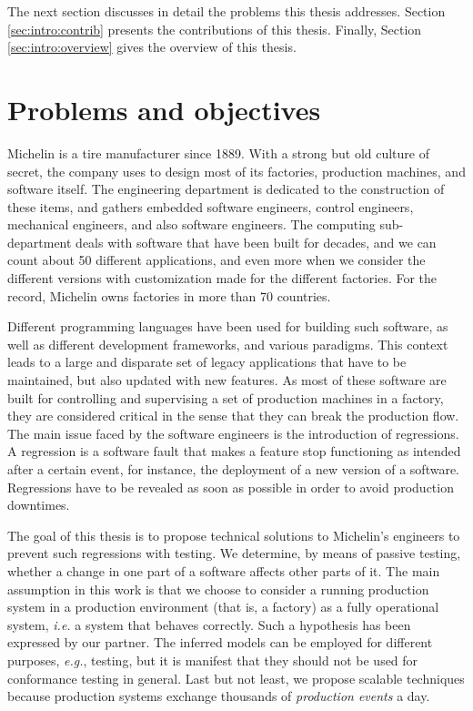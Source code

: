 The next section discusses in detail the problems this thesis
addresses. Section \ref{sec:intro:contrib} presents the
contributions of this thesis. Finally, Section
\ref{sec:intro:overview} gives the overview of this thesis.


\section{Problems and objectives}
\label{sec:intro:problems}

Michelin is a tire manufacturer since 1889. With a strong but old
culture of secret, the company uses to design most of its
factories, production machines, and software itself. The
engineering department is dedicated to the construction of these
items, and gathers embedded software engineers, control
engineers, mechanical engineers, and also software engineers. The
computing sub-department deals with software that have been built
for decades, and we can count about 50 different applications,
and even more when we consider the different versions with
customization made for the different factories. For the record,
Michelin owns factories in more than 70 countries.

Different programming languages have been used for building such
software, as well as different development frameworks, and
various paradigms. This context leads to a large and disparate
set of legacy applications that have to be maintained, but also
updated with new features. As most of these software are built
for controlling and supervising a set of production machines in a
factory, they are considered critical in the sense that they can
break the production flow. The main issue faced by the software
engineers is the introduction of regressions. A regression is a
software fault that makes a feature stop functioning as intended
after a certain event, for instance, the deployment of a new
version of a software. Regressions have to be revealed as soon as
possible in order to avoid production downtimes.

The goal of this thesis is to propose technical solutions to
Michelin's engineers to prevent such regressions with testing.
We determine, by means of passive testing, whether a change in
one part of a software affects other parts of it. The main
assumption in this work is that we choose to consider a running
production system in a production environment (that is, a
factory) as a fully operational system, \emph{i.e.} a system that
behaves correctly.  Such a hypothesis has been expressed by our
partner. The inferred models can be employed for different
purposes, \emph{e.g.}, testing, but it is manifest that they
should not be used for conformance testing in general. Last but
not least, we propose scalable techniques because production
systems exchange thousands of \emph{production events} a day.

